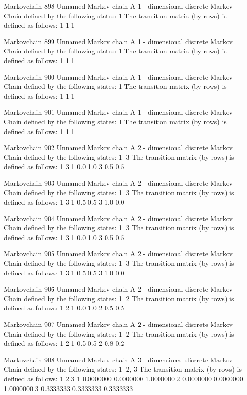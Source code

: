\documentclass[
  nojss]{jss}
\begin{document}
\begin{CodeChunk}
\begin{CodeOutput}
Markovchain  898 
Unnamed Markov chain 
 A  1 - dimensional discrete Markov Chain defined by the following states: 
 1 
 The transition matrix  (by rows)  is defined as follows: 
  1
1 1

Markovchain  899 
Unnamed Markov chain 
 A  1 - dimensional discrete Markov Chain defined by the following states: 
 1 
 The transition matrix  (by rows)  is defined as follows: 
  1
1 1

Markovchain  900 
Unnamed Markov chain 
 A  1 - dimensional discrete Markov Chain defined by the following states: 
 1 
 The transition matrix  (by rows)  is defined as follows: 
  1
1 1

Markovchain  901 
Unnamed Markov chain 
 A  1 - dimensional discrete Markov Chain defined by the following states: 
 1 
 The transition matrix  (by rows)  is defined as follows: 
  1
1 1

Markovchain  902 
Unnamed Markov chain 
 A  2 - dimensional discrete Markov Chain defined by the following states: 
 1, 3 
 The transition matrix  (by rows)  is defined as follows: 
    1   3
1 0.0 1.0
3 0.5 0.5

Markovchain  903 
Unnamed Markov chain 
 A  2 - dimensional discrete Markov Chain defined by the following states: 
 1, 3 
 The transition matrix  (by rows)  is defined as follows: 
    1   3
1 0.5 0.5
3 1.0 0.0

Markovchain  904 
Unnamed Markov chain 
 A  2 - dimensional discrete Markov Chain defined by the following states: 
 1, 3 
 The transition matrix  (by rows)  is defined as follows: 
    1   3
1 0.0 1.0
3 0.5 0.5

Markovchain  905 
Unnamed Markov chain 
 A  2 - dimensional discrete Markov Chain defined by the following states: 
 1, 3 
 The transition matrix  (by rows)  is defined as follows: 
    1   3
1 0.5 0.5
3 1.0 0.0

Markovchain  906 
Unnamed Markov chain 
 A  2 - dimensional discrete Markov Chain defined by the following states: 
 1, 2 
 The transition matrix  (by rows)  is defined as follows: 
    1   2
1 0.0 1.0
2 0.5 0.5

Markovchain  907 
Unnamed Markov chain 
 A  2 - dimensional discrete Markov Chain defined by the following states: 
 1, 2 
 The transition matrix  (by rows)  is defined as follows: 
    1   2
1 0.5 0.5
2 0.8 0.2

Markovchain  908 
Unnamed Markov chain 
 A  3 - dimensional discrete Markov Chain defined by the following states: 
 1, 2, 3 
 The transition matrix  (by rows)  is defined as follows: 
          1         2         3
1 0.0000000 0.0000000 1.0000000
2 0.0000000 0.0000000 1.0000000
3 0.3333333 0.3333333 0.3333333


\end{CodeOutput}
\end{CodeChunk}
\end{document}
